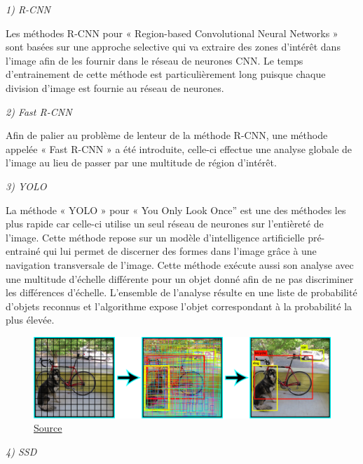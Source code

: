 \documentclass[a4paper,12pt]{article} %
\begin{document}
\textit{1)	R-CNN}\newline

Les méthodes R-CNN pour « Region-based Convolutional Neural Networks » sont basées sur une approche selective qui va extraire des zones d’intérêt dans l’image afin de les fournir dans le réseau de neurones CNN. Le temps d’entrainement de cette méthode est particulièrement long puisque chaque division d’image est fournie au réseau de neurones.\newline 

\textit{2)	Fast R-CNN}\newline

Afin de palier au problème de lenteur de la méthode R-CNN, une méthode appelée « Fast R-CNN » a été introduite, celle-ci effectue une analyse globale de l’image au lieu de passer par une multitude de région d’intérêt.\newline

\textit{3)	YOLO}\newline 

La méthode « YOLO » pour « You Only Look Once” est une des méthodes les plus rapide car celle-ci utilise un seul réseau de neurones sur l’entièreté de l’image. Cette méthode repose sur un modèle d’intelligence artificielle pré-entrainé qui lui permet de discerner des formes dans l’image grâce à une navigation transversale de l’image. Cette méthode exécute aussi son analyse avec une multitude d’échelle différente pour un objet donné afin de ne pas discriminer les différences d’échelle. L’ensemble de l’analyse résulte en une liste de probabilité d’objets reconnus et l’algorithme expose l’objet correspondant à la probabilité la plus élevée.\newline
\begin{figure}[h] %
  \centering %
  \includegraphics[scale=0.20]{YOLO.png} %
  \caption{\href{https://pjreddie.com/darknet/yolov2/}{Source} }
\end{figure}
\newpage
\textit{4)	SSD}\newline
\end{document}
